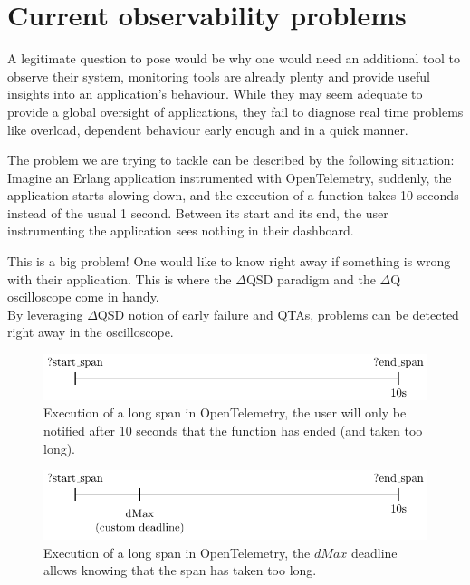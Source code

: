 \section{Current observability problems}

    A legitimate question to pose would be why one would need an additional tool to observe their system, monitoring tools are already plenty and provide useful insights into an application's behaviour. While they may seem adequate to provide a global oversight of applications, they fail to diagnose real time problems like overload, dependent behaviour early enough and in a quick manner.

    The problem we are trying to tackle can be described by the following situation: 
    Imagine an Erlang application instrumented with OpenTelemetry, suddenly, the application starts slowing down, and the execution of a function takes 10 seconds instead of the usual 1 second. Between its start and its end, the user instrumenting the application sees nothing in their dashboard.
    
    This is a big problem! One would like to know right away if something is wrong with their application. This is where the $\Delta$QSD paradigm and the $\Delta$Q oscilloscope come in handy. \\ 
   By leveraging $\Delta$QSD notion of early failure and QTAs, problems can be detected right away in the oscilloscope. 
    
    \begin{figure}[H]
        \begin{center}
            \includegraphics{tikz/start_end.pdf}
        \end{center}
        \caption{Execution of a long span in OpenTelemetry, the user will only be notified after 10 seconds that the function has ended (and taken too long).}
    \end{figure}

    \begin{figure}[H]
        \begin{center}
            \includegraphics{tikz/start_end_dmax.pdf}
        \end{center}
        \caption{Execution of a long span in OpenTelemetry, the $dMax$ deadline allows knowing that the span has taken too long.}
        \label{fig:otel_dmax}
    \end{figure} 



